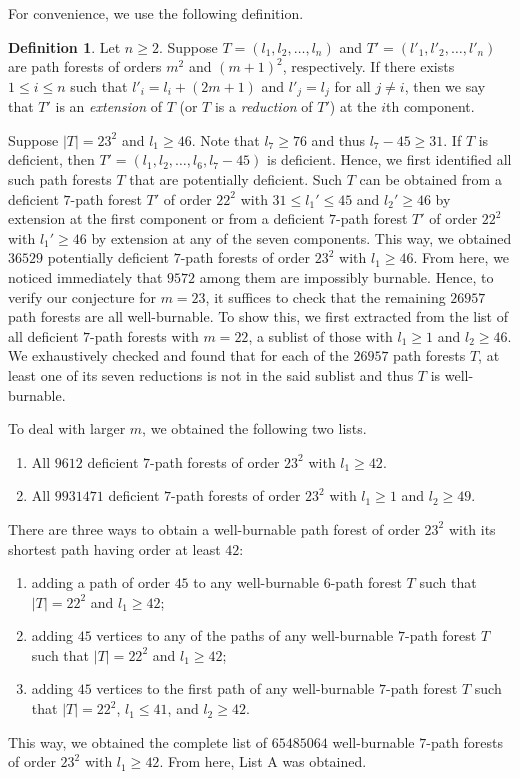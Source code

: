 \documentclass[
final
]{dmtcs-episciences}
\theoremstyle{definition}
\newtheorem{definition}[theorem]{Definition}
\theoremstyle{remark}
\begin{document}
For convenience, we use the following definition.

\begin{definition}
	Let $n\geq 2$. 	Suppose $T =(l_1,l_2, \ldots, l_n)$ and $T'=(l'_1,l'_2, \ldots, l'_n)$ are path forests of orders $m^2$ and $(m+1)^2$, respectively.
	If there exists $1\leq i\leq n$ such that $l'_i= l_i+(2m+1)$ and $l'_j=l_j$ for all $j\neq i$, then we say that $T'$ is an \emph{extension} of $T$ (or $T$ is a \emph{reduction} of $T'$) at the $i$th component.
\end{definition}

Suppose  $\vert T\vert =23^2$ and $l_1\geq 46$. Note that $l_7\geq 76$ and thus $l_7-45\geq 31$. If $T$ is deficient, then $T'=(l_1, l_2, \ldots, l_6, l_7-45)$ is deficient. 
Hence, we first identified all  such path forests $T$ that are potentially deficient.
Such $T$ can be obtained from a deficient $7$-path forest $T'$ of order $22^2$ with $31\leq l_
1'\leq 45$ and $l_2'\geq 46$ by extension at the first component or  from a deficient $7$-path forest $T'$ of order $22^2$ with $l_1'\geq 46$ by extension at any of the seven components. This way, we obtained $36529$ potentially deficient $7$-path forests of order $23^2$ with $l_1\geq 46$.
From here, we noticed immediately that $9572$ among them are impossibly burnable. Hence, to verify our conjecture for $m=23$, it suffices to check that the remaining $26957$ path forests are all well-burnable. To show this, we first extracted from the list of all deficient $7$-path forests with $m=22$, a sublist of those with $l_1\geq 1$ and $l_2\geq 46$. We exhaustively checked and found that for each of the $26957$ path forests $T$, at least one of its seven reductions is not in the said sublist and thus $T$ is well-burnable.

To deal with larger $m$, we obtained the following two lists. 
\begin{enumerate}[{List }A.]
	\item All $9612$ deficient $7$-path forests of order $23^2$ with $l_1\geq 42$. 
	\item All $9931471$ deficient $7$-path forests of order $23^2$ with $l_1\geq 1$ and $l_2\geq 49$. 
\end{enumerate}

There are three ways to obtain a well-burnable path forest of order $23^2$ with its shortest path having order at least $42$:


\begin{enumerate}
	\item adding a path of order $45$ to any well-burnable $6$-path forest $T$ such that $\vert T\vert=22^2$ and $l_1\geq 42$;
	\item adding $45$ vertices to any of the paths of any well-burnable $7$-path forest $T$ such that $\vert T\vert=22^2$  and $l_1\geq 42$;
	\item adding $45$ vertices to the first path of any well-burnable $7$-path forest $T$ such that $\vert T\vert=22^2$, $l_1\leq 41$, and $l_2\geq 42$.
\end{enumerate}
This way, we obtained the complete list of $65485064$ well-burnable $7$-path forests of order $23^2$ with $l_1\geq 42$. From here, List A was obtained.
\end{document}
